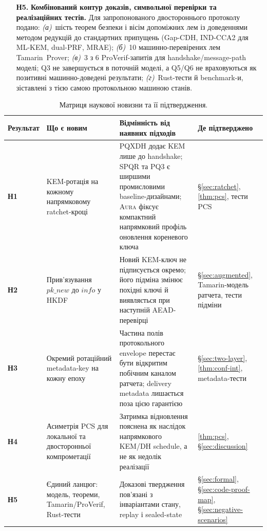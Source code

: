 \documentclass[11pt,a4paper]{article}
\theoremstyle{definition}
\newcommand{\GapCDH}{\textsf{Gap-CDH}}
\newcommand{\INDCCA}{\textsf{IND-CCA2}}
\newcommand{\MRAE}{\textsf{MRAE}}
\newcommand{\dualPRF}{\textsf{dual-PRF}}
\newcommand{\Aura}{\mbox{\normalfont\scshape Aura}}
\newcommand{\SPQR}{\textsf{SPQR}}
\newcommand{\PQThree}{\textsf{PQ3}}
\begin{document}
\begin{enumerate}
  \item[\textbf{Н5.}] \textbf{Комбінований контур доказів,
    символьної перевірки та реалізаційних тестів.}
    Для запропонованого двостороннього протоколу подано:
    \emph{(а)}~шість теорем безпеки і вісім допоміжних лем із
    доведеннями методом редукцій до стандартних припущень
    (\GapCDH{}, \INDCCA{} для ML-KEM, \dualPRF{}, \MRAE{});
    \emph{(б)}~10 машинно-перевірених лем Tamarin~Prover;
    \emph{(в)}~3 з 6 ProVerif-запитів для handshake/message-path моделі;
    Q3 не завершується в поточній моделі, а Q5/Q6 не враховуються як
    позитивні машинно-доведені результати; \emph{(г)}~Rust-тести й benchmark-и,
    зіставлені з тією самою протокольною машиною станів.
\end{enumerate}

\def\NoveltyPCSRef{\cref{thm:pcs}}
\def\NoveltyConfRef{\cref{thm:conf-int}}
\def\NoveltyDiscRef{\S\ref{sec:discussion}}
\def\NoveltyFormalRefs{\S\ref{sec:formal}, \S\ref{sec:code-proof-map},
\S\ref{sec:negative-scenarios}}

\begin{table}[H]
\centering
\caption{Матриця наукової новизни та її підтвердження.}
\label{tab:novelty-matrix}
\small
\begin{tabularx}{\textwidth}{@{}p{}YYY@{}}
\toprule
Результат & Що є новим & Відмінність від наявних підходів & Де підтверджено \\
\midrule
\textbf{Н1} &
KEM-ротація на кожному напрямковому ratchet-кроці &
PQXDH додає KEM лише до handshake; \SPQR{} та \PQThree{} є ширшими
промисловими baseline-дизайнами; \Aura{} фіксує компактний напрямковий
профіль оновлення кореневого ключа &
\S\ref{sec:ratchet}, \NoveltyPCSRef, тести PCS \\
\addlinespace
\textbf{Н2} &
Прив'язування $\mathit{pk\_new}$ до $\mathit{info}$ у HKDF &
Новий KEM-ключ не підписується окремо; його підміна змінює похідні ключі й виявляється при наступній AEAD-перевірці &
\S\ref{sec:augmented}, Tamarin-модель ратчета, тести підміни \\
\addlinespace
\textbf{Н3} &
Окремий ротаційний metadata-key на кожну епоху &
Частина полів протокольного envelope перестає бути відкритим побічним
каналом ратчета; delivery metadata лишається поза цією гарантією &
\S\ref{sec:two-layer}, \NoveltyConfRef, metadata-тести \\
\addlinespace
\textbf{Н4} &
Асиметрія PCS для локальної та двосторонньої компрометації &
Затримка відновлення пояснена як наслідок напрямкового KEM/DH schedule,
а не як недолік реалізації &
\NoveltyPCSRef, \NoveltyDiscRef \\
\addlinespace
\textbf{Н5} &
Єдиний ланцюг: модель, теореми, Tamarin/ProVerif, Rust-тести &
Доказові твердження пов'язані з інваріантами стану, replay і sealed-state &
\NoveltyFormalRefs \\
\bottomrule
\end{tabularx}
\end{table}
\end{document}
